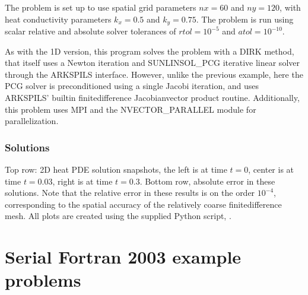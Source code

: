 \documentclass[letterpaper,10pt,english]{sphinxmanual}
\begin{document}
\sphinxAtStartPar
The problem is set up to use spatial grid parameters \(nx=60\) and
\(ny=120\), with heat conductivity parameters \(k_x=0.5\) and
\(k_y=0.75\).  The problem is run using scalar relative and
absolute solver tolerances of \(rtol=10^{-5}\) and
\(atol=10^{-10}\).

\sphinxAtStartPar
As with the 1D version, this program solves the problem with a DIRK
method, that itself uses a Newton iteration and SUNLINSOL\_PCG
iterative linear solver through the ARKSPILS interface.  However,
unlike the previous example, here the PCG solver is preconditioned
using a single Jacobi iteration, and uses ARKSPILS’ built\sphinxhyphen{}in
finite\sphinxhyphen{}difference Jacobian\sphinxhyphen{}vector product routine. Additionally, this
problem uses MPI and the NVECTOR\_PARALLEL module for parallelization.


\subsection{Solutions}
\label{\detokenize{cpp_parallel:solutions}}
\sphinxAtStartPar
Top row: 2D heat PDE solution snapshots, the left is at time \(t=0\),
center is at time \(t=0.03\), right is at time \(t=0.3\).
Bottom row, absolute error in these solutions.  Note that the relative
error in these results is on the order \(10^{-4}\), corresponding
to the spatial accuracy of the relatively coarse finite\sphinxhyphen{}difference
mesh.  All plots are created using the supplied Python script,
.

\noindent{}

\noindent{}

\noindent{}

\noindent{}

\noindent{}

\noindent{}

\sphinxstepscope


\chapter{Serial Fortran 2003 example problems}
\label{\detokenize{f2003_serial:serial-fortran-2003-example-problems}}\label{\detokenize{f2003_serial:serial-f2003}}\label{\detokenize{f2003_serial::doc}}
\end{document}

